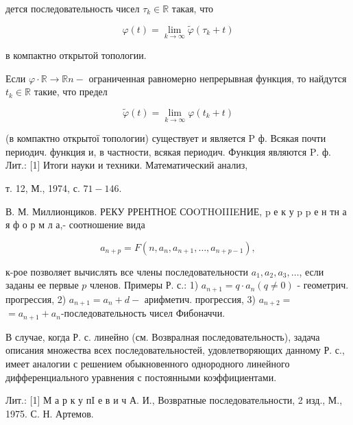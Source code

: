 \documentclass[10pt]{article}
\begin{document}
дется последовательность чисел $\tau_{k} \in \mathbb{R}$ такая, что



\[

\varphi(t)=\lim _{k \rightarrow \infty} \tilde{\varphi}\left(\tau_{k}+t\right)

\]



в компактно открытой топологии.



Если $\varphi \cdot \mathbb{R} \rightarrow \mathbb{R} n-$ ограниченная равномерно непрерывная функция, то найдутся $t_{k} \in \mathbb{R}$ такие, что предел



\[

\tilde{\varphi}(t)=\lim _{k \rightarrow \infty} \varphi\left(t_{k}+t\right)

\]



(в компактно открытої топологии) существует и является $\mathrm{P}$ ф. Всякая почти периодич. функция и, в частности, всякая периодич. Функция являются $\mathrm{P}$. ф. Лит.: [1] Итоги науки и техники. Математический анализ,

т. 12, М., 1974, с. $71-146$.

В. М. Миллионциков. РЕКУ РРЕНТНОЕ СОOTHOIIIEНИЕ, $\mathrm{p}$ е к у $\mathrm{p}$ p е н тн а я ф о р м л а,- соотношение вида



\[

a_{n+p}=F\left(n, a_{n}, a_{n+1}, \ldots, a_{n+p-1}\right),

\]



к-рое позволяет вычислять все члены последовательности $a_{1}, a_{2}, a_{3}, \ldots$, если заданы ее первые $p$ членов. Примеры Р. с.: 1) $a_{n+1}=q \cdot a_{n}(q \neq 0)$ - геометрич. прогрессия, 2) $a_{n+1}=a_{n}+d-$ арифметич. прогрессия, 3) $a_{n+2}=$ $=a_{n+1}+a_{n}$-последовательность чисел Фибоначчи.



В случае, когда Р. с. линейно (см. Возвралная последовательность), задача описания множества всех последовательностей, удовлетворяющих данному Р. с., имеет аналогии с решением обыкновенного однородного линейного дифференциального уравнения с постоянными коэффициентами.



Лит.: [1] М а р к у пI е в и ч А. И., Возвратные последовательности, 2 изд., М., 1975. С. Н. Артемов.
\end{document}
